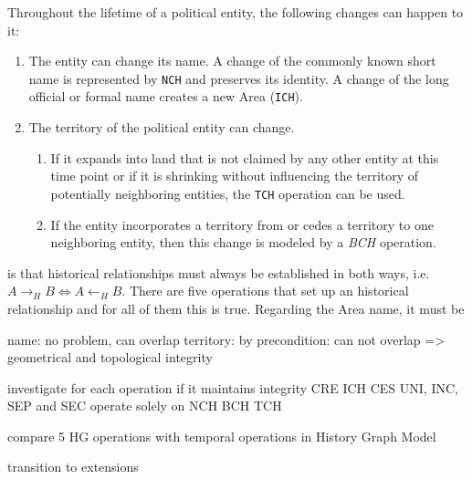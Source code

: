 Throughout the lifetime of a political entity, the following changes can happen to it:
\begin{enumerate}
  \item The entity can change its name. A change of the commonly known short name is represented by \texttt{NCH} and preserves its identity. A change of the long official or formal name creates a new Area (\texttt{ICH}).
  \item The territory of the political entity can change.
  \begin{enumerate}
    \item If it expands into land that is not claimed by any other entity at this time point or if it is shrinking without influencing the territory of potentially neighboring entities, the \texttt{TCH} operation can be used.
    \item If the entity incorporates a territory from or cedes a territory to one neighboring entity, then this change is modeled by a \emph{BCH} operation.
  \end{enumerate}
\end{enumerate}



is that historical relationships must always be established in both ways, i.e. $A \rightarrow_H B \Leftrightarrow A \leftarrow_H B $. There are five operations that set up an historical relationship and for all of them this is true. Regarding the Area name, it must be



name: no problem, can overlap
territory: by precondition: can not overlap
=> geometrical and topological integrity

investigate for each operation if it maintains integrity
CRE
ICH
CES
UNI, INC, SEP and SEC operate solely on
NCH
BCH
TCH



compare 5 HG operations with temporal operations in History Graph Model


\vspace{2em}

transition to extensions